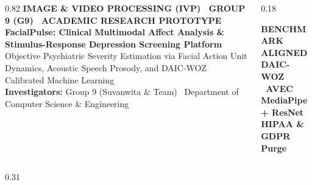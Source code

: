 \documentclass[final]{beamer}
\begin{document}
\begin{frame}[t]

\begin{tcolorbox}[colback=NavyBlue,colframe=CyanAccent,arc=0mm,boxrule=0pt,bottomrule=3pt,top=8mm,bottom=8mm,left=12mm,right=12mm]
  \begin{columns}
    \begin{column}{0.82\textwidth}
      \vspace{0.2cm}
      {\scriptsize \color{CyanAccent}\textbf{IMAGE \& VIDEO PROCESSING (IVP) \textbullet\ GROUP 9 (G9) \textbullet\ ACADEMIC RESEARCH PROTOTYPE}}\\[0.2cm]
      {\veryhuge \textbf{FacialPulse: Clinical Multimodal Affect Analysis \& Stimulus-Response Depression Screening Platform}}\\[0.3cm]
      {\large \color{BorderSlate!80} Objective Psychiatric Severity Estimation via Facial Action Unit Dynamics, Acoustic Speech Prosody, and DAIC-WOZ Calibrated Machine Learning}\\[0.3cm]
      {\small \textbf{Investigators:} Group 9 (Suvanwita \& Team) \textbullet\ Department of Computer Science \& Engineering}
    \end{column}
    \begin{column}{0.18\textwidth}
      \centering
      \begin{tcolorbox}[colback=MedBlue!20,colframe=CyanAccent,arc=2mm,boxrule=1pt,width=0.95\linewidth]
        \centering\scriptsize \color{white}
        \textbf{BENCHMARK ALIGNED}\\[0.1cm]
        \textbf{DAIC-WOZ \textbullet\ AVEC}\\[0.1cm]
        \textbf{MediaPipe + ResNet}\\[0.1cm]
        \textbf{HIPAA \& GDPR Purge}
      \end{tcolorbox}
    \end{column}
  \end{columns}
\end{tcolorbox}

\vspace{0.4cm}

\begin{columns}[t]

  \begin{column}{0.31\textwidth}


\end{column}
\end{columns}
\end{frame}
\end{document}
